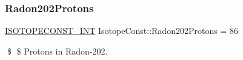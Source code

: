 \subsubsection{\texorpdfstring{Radon202\+Protons}{Radon202Protons}}
{\footnotesize\ttfamily \mbox{\hyperlink{group___isotope_const-_macros_ga5f18360b3e99483a35c32d789e62621c}{I\+S\+O\+T\+O\+P\+E\+C\+O\+N\+S\+T\+\_\+\+I\+NT}} Isotope\+Const\+::\+Radon202\+Protons = 86}

\$ \$ Protons in Radon-\/202. 